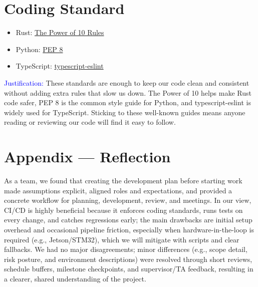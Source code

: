 \documentclass{article}
\begin{document}
\section{Coding Standard}

\begin{itemize}
  \item Rust:
        \href{https://en.wikipedia.org/wiki/The_Power_of_10:_Rules_for_Developing_Safety-Critical_Code}{The
          Power of 10 Rules}
  \item Python: \href{https://peps.python.org/pep-0008/}{PEP 8}
  \item TypeScript:
        \href{https://typescript-eslint.io/packages/typescript-eslint}{typescript-eslint}

\end{itemize}

\textcolor{blue}{Justification:} These standards are enough to keep our code clean
and consistent without adding extra rules that slow us down. The Power of 10 helps
make Rust code safer, PEP 8 is the common style guide for Python, and
typescript-eslint is widely used for TypeScript. Sticking to these well-known
guides means anyone reading or reviewing our code will find it easy to follow.


\newpage{}

\section*{Appendix --- Reflection}


As a team, we found that creating the development plan before starting work made
assumptions explicit, aligned roles and expectations, and provided a concrete
workflow for planning, development, review, and meetings. In our view, CI/CD is
highly beneficial because it enforces coding standards, runs tests on every
change, and catches regressions early; the main drawbacks are initial setup
overhead and occasional pipeline friction, especially when hardware-in-the-loop
is required (e.g., Jetson/STM32), which we will mitigate with scripts and clear
fallbacks. We had no major disagreements; minor differences (e.g., scope detail,
risk posture, and environment descriptions) were resolved through short reviews,
schedule buffers, milestone checkpoints, and supervisor/TA feedback, resulting
in a clearer, shared understanding of the project.
\end{document}
